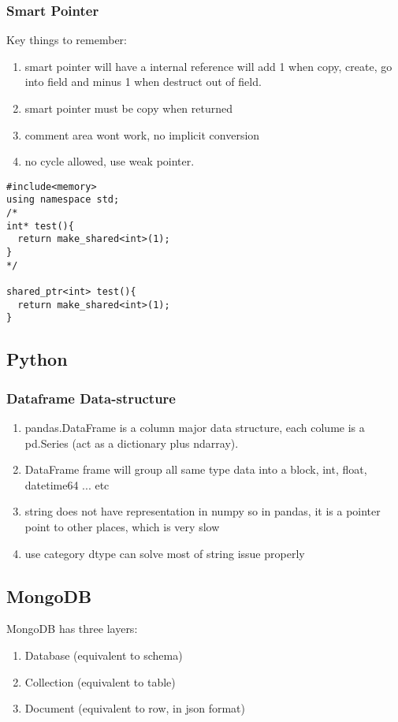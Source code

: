 \subsubsection{Smart Pointer}
Key things to remember:
\begin{enumerate}
\item smart pointer will have a internal reference will add 1 when copy, create, go into field and minus 1 when destruct out of field.
\item smart pointer must be copy when returned
\item comment area wont work, no implicit conversion
\item no cycle allowed, use weak pointer.
\end{enumerate}

\begin{lstlisting}
#include<memory>
using namespace std;
/*
int* test(){
  return make_shared<int>(1);
}
*/

shared_ptr<int> test(){
  return make_shared<int>(1);
}
\end{lstlisting}
\subsection{Python}
\subsubsection{Dataframe Data-structure}
\begin{enumerate}
\item pandas.DataFrame is a column major data structure, each colume is a pd.Series (act as a dictionary plus ndarray).
\item DataFrame frame will group all same type data into a block, int, float, datetime64 ... etc
\item string does not have representation in numpy so in pandas, it is a pointer point to other places, which is very slow
\item use {\color{red}category} dtype can solve most of string issue properly
\end{enumerate}

\subsection{MongoDB}

MongoDB has three layers:
\begin{enumerate}
\item Database (equivalent to schema)
\item Collection (equivalent to table)
\item Document (equivalent to row, in json format)
\end{enumerate}

